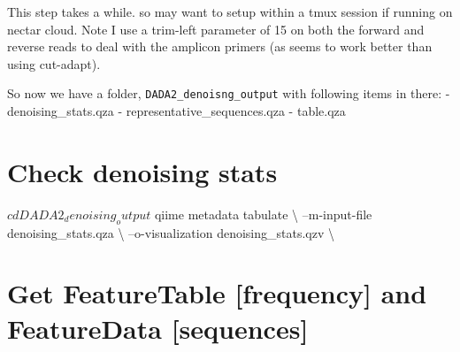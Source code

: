 \documentclass[]{book}
\newenvironment{Shaded}{\begin{snugshade}}{\end{snugshade}}
\newcommand{\BuiltInTok}[1]{#1}
\newcommand{\ExtensionTok}[1]{#1}
\newcommand{\NormalTok}[1]{#1}
\newcommand{\OperatorTok}[1]{\textcolor[rgb]{0.81,0.36,0.00}{\textbf{#1}}}
\begin{document}
This step takes a while. so may want to setup within a tmux session if running on nectar cloud. Note I use a trim-left parameter of 15 on both the forward and reverse reads to deal with the amplicon primers (as seems to work better than using cut-adapt).

\begin{Shaded}
\end{Shaded}

So now we have a folder, \texttt{DADA2\_denoisng\_output} with following items in there:
- denoising\_stats.qza
- representative\_sequences.qza
- table.qza

\hypertarget{check-denoising-stats}{%
\section{Check denoising stats}\label{check-denoising-stats}}

\begin{Shaded}
\begin{Highlighting}[]
\NormalTok{$ }\BuiltInTok{cd}\NormalTok{ DADA2_denoising_output}

\NormalTok{$ }\ExtensionTok{qiime}\NormalTok{ metadata tabulate \textbackslash{}}
\NormalTok{--m-input-file denoising_stats.qza \textbackslash{}}
\NormalTok{--o-visualization denoising_stats.qzv \textbackslash{}}
\end{Highlighting}
\end{Shaded}

\hypertarget{get-featuretable-frequency-and-featuredata-sequences}{%
\section{Get FeatureTable {[}frequency{]} and FeatureData {[}sequences{]}}\label{get-featuretable-frequency-and-featuredata-sequences}}
\end{document}
